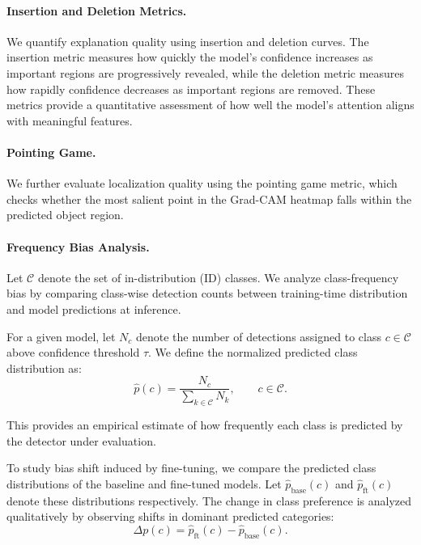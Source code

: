 \paragraph{Insertion and Deletion Metrics.}
We quantify explanation quality using insertion and deletion curves. The insertion metric measures how quickly the model's confidence increases as important regions are progressively revealed, while the deletion metric measures how rapidly confidence decreases as important regions are removed. These metrics provide a quantitative assessment of how well the model's attention aligns with meaningful features.

\paragraph{Pointing Game.}
We further evaluate localization quality using the pointing game metric, which checks whether the most salient point in the Grad-CAM heatmap falls within the predicted object region.

\paragraph{Frequency Bias Analysis.}
Let $\mathcal{C}$ denote the set of in-distribution (ID) classes. We analyze class-frequency bias by comparing class-wise detection counts between training-time distribution and model predictions at inference.

For a given model, let $N_c$ denote the number of detections assigned to class $c \in \mathcal{C}$ above confidence threshold $\tau$. We define the normalized predicted class distribution as:
\begin{equation}
    \hat{p}(c)=\frac{N_c}{\sum_{k\in\mathcal{C}}N_k}, \qquad c\in\mathcal{C}.
\end{equation}

This provides an empirical estimate of how frequently each class is predicted by the detector under evaluation.

To study bias shift induced by fine-tuning, we compare the predicted class distributions of the baseline and fine-tuned models. Let $\hat{p}_{\mathrm{base}}(c)$ and $\hat{p}_{\mathrm{ft}}(c)$ denote these distributions respectively. The change in class preference is analyzed qualitatively by observing shifts in dominant predicted categories:
\begin{equation}
    \Delta p(c) = \hat{p}_{\mathrm{ft}}(c) - \hat{p}_{\mathrm{base}}(c).
\end{equation}

